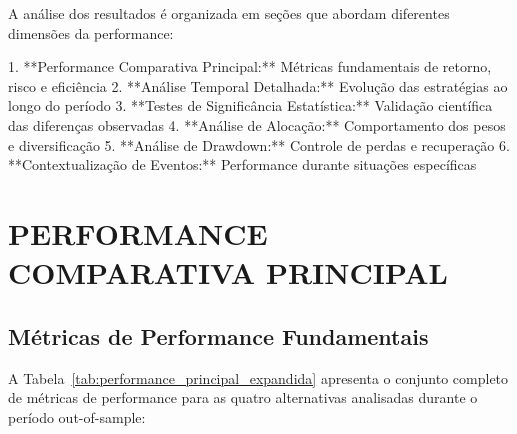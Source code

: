 A análise dos resultados é organizada em seções que abordam diferentes dimensões da performance:

1. **Performance Comparativa Principal:** Métricas fundamentais de retorno, risco e eficiência
2. **Análise Temporal Detalhada:** Evolução das estratégias ao longo do período
3. **Testes de Significância Estatística:** Validação científica das diferenças observadas
4. **Análise de Alocação:** Comportamento dos pesos e diversificação
5. **Análise de Drawdown:** Controle de perdas e recuperação
6. **Contextualização de Eventos:** Performance durante situações específicas

\section{PERFORMANCE COMPARATIVA PRINCIPAL}

\subsection{Métricas de Performance Fundamentais}

A Tabela~\ref{tab:performance_principal_expandida} apresenta o conjunto completo de métricas de performance para as quatro alternativas analisadas durante o período out-of-sample:

